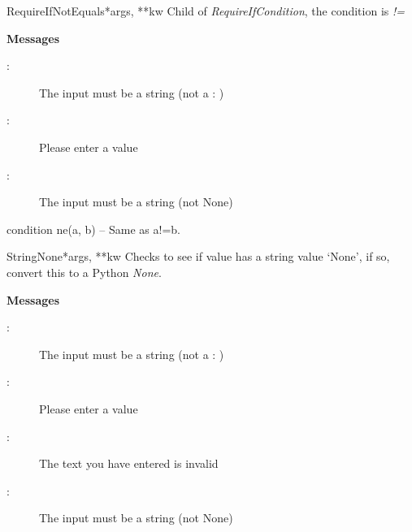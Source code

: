 \documentclass[letterpaper,10pt,english]{manual}
\begin{document}
\hypertarget{webscavator.forms.validators.RequireIfNotEquals}{}\begin{classdesc}{RequireIfNotEquals}{*args, **kw}
Child of \emph{RequireIfCondition}, the condition is \emph{!=}

\textbf{Messages}
\begin{description}
\item[:]
The input must be a string (not a : )

\item[:]
Please enter a value

\item[:]
The input must be a string (not None)

\end{description}

\hypertarget{webscavator.forms.validators.RequireIfNotEquals.condition}{}\begin{methoddesc}{condition}{}
ne(a, b) -- Same as a!=b.
\end{methoddesc}
\end{classdesc}

\hypertarget{webscavator.forms.validators.StringNone}{}\begin{classdesc}{StringNone}{*args, **kw}
Checks to see if value has a string value `None', if so, convert this to a Python
\emph{None}.

\textbf{Messages}
\begin{description}
\item[:]
The input must be a string (not a : )

\item[:]
Please enter a value

\item[:]
The text you have entered is invalid

\item[:]
The input must be a string (not None)

\end{description}
\end{classdesc}
\end{document}
